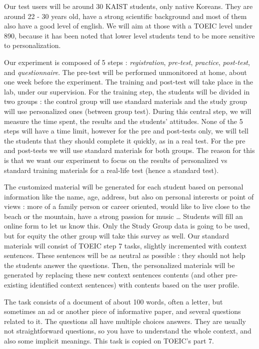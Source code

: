 \documentclass[a4paper,12pt]{article}
\begin{document}
Our test users will be around 30 KAIST students, only native Koreans. They are around 22 - 30 years old, have a strong scientific background and most of them also have a good level of english. We will aim at those with a TOEIC level under 890, because it has been noted that lower level students tend to be more sensitive to personalization.

Our experiment is composed of 5 steps : \textit{registration}, \textit{pre-test}, \textit{practice}, \textit{post-test}, and \textit{questionnaire}. The pre-test will be performed unmonitored at home, about one week before the experiment. The training and post-test will take place in the lab, under our supervision. For the training step, the students will be divided in two groups : the control group will use standard materials and the study group will use personalized ones (between group test). During this central step, we will measure the time spent, the results and the students' attitudes. None of the 5 steps will have a time limit, however for the pre and post-tests only, we will tell the students that they should complete it quickly, as in a real test. For the pre and post-tests we will use standard materials for both groups. The reason for this is that we want our experiment to focus on the results of personalized vs standard training materials for a real-life test (hence a standard test).

The customized material will be generated for each student based on personal information like the name, age, address, but also on personal interests or point of views : more of a family person or career oriented, would like to live close to the beach or the mountain, have a strong passion for music … Students will fill an online form to let us know this. Only the Study Group data is going to be used, but for equity the other group will take this survey as well. Our standard materials will consist of TOEIC step 7 tasks, slightly incremented with context sentences. These sentences will be as neutral as possible : they should not help the students answer the questions. Then, the personalized materials will be generated by replacing these new context sentences contents (and other pre-existing identified context sentences) with contents based on the user profile.

The task consists of a document of about 100 words, often a letter, but sometimes an ad or another piece of informative paper, and several questions related to it. The questions all have multiple choices answers. They are usually not straightforward questions, so you have to understand the whole context, and also some implicit meanings. This task is copied on TOEIC's part 7.
\end{document}
